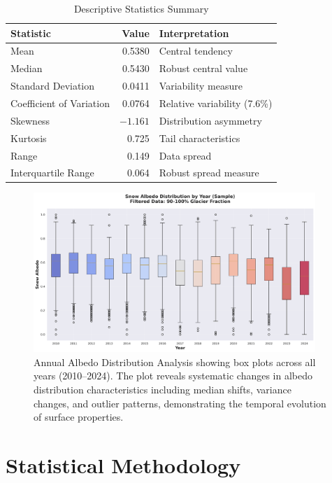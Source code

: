 \documentclass[12pt,a4paper]{article}
\begin{document}
\begin{table}[H]
\centering
\caption{Descriptive Statistics Summary}
\label{tab:descriptive_stats}
\begin{tabular}{@{}lrl@{}}
\toprule
\textbf{Statistic} & \textbf{Value} & \textbf{Interpretation} \\
\midrule
Mean & 0.5380 & Central tendency \\
Median & 0.5430 & Robust central value \\
Standard Deviation & 0.0411 & Variability measure \\
Coefficient of Variation & 0.0764 & Relative variability (7.6\%) \\
Skewness & $-1.161$ & Distribution asymmetry \\
Kurtosis & 0.725 & Tail characteristics \\
Range & 0.149 & Data spread \\
Interquartile Range & 0.064 & Robust spread measure \\
\bottomrule
\end{tabular}
\end{table}

\begin{figure}[H]
\centering
\includegraphics[width=0.95\textwidth]{plots/distribution_all_years.png}
\caption{Annual Albedo Distribution Analysis showing box plots across all years (2010--2024). The plot reveals systematic changes in albedo distribution characteristics including median shifts, variance changes, and outlier patterns, demonstrating the temporal evolution of surface properties.}
\label{fig:annual_distributions}
\end{figure}

\section{Statistical Methodology}
\end{document}
